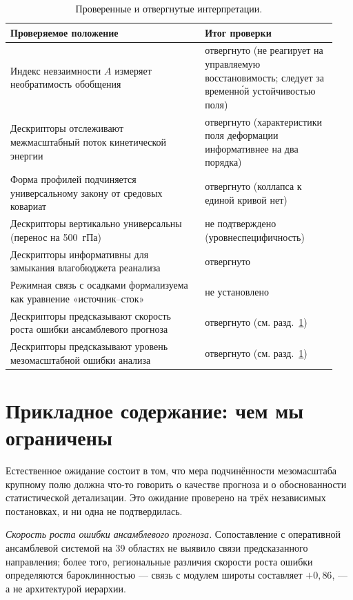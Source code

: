 \documentclass[11pt,a4paper]{article}
\begin{document}
\begin{table}[t]
\centering
\caption{Проверенные и отвергнутые интерпретации.}
\label{tab:negative}
\small
\begin{tabular}{@{}p{0.56\linewidth}p{0.38\linewidth}@{}}
\toprule
Проверяемое положение & Итог проверки\\
\midrule
Индекс невзаимности $A$ измеряет необратимость обобщения & отвергнуто (не реагирует на управляемую восстановимость; следует за временн\'{о}й устойчивостью поля)\\
Дескрипторы отслеживают межмасштабный поток кинетической энергии & отвергнуто (характеристики поля деформации информативнее на два порядка)\\
Форма профилей подчиняется универсальному закону от средовых ковариат & отвергнуто (коллапса к единой кривой нет)\\
Дескрипторы вертикально универсальны (перенос на 500~гПа) & не подтверждено (уровнеспецифичность)\\
Дескрипторы информативны для замыкания влагобюджета реанализа & отвергнуто\\
Режимная связь с осадками формализуема как уравнение «источник--сток» & не установлено\\
Дескрипторы предсказывают скорость роста ошибки ансамблевого прогноза & отвергнуто (см. разд.~\ref{sec:applied})\\
Дескрипторы предсказывают уровень мезомасштабной ошибки анализа & отвергнуто (см. разд.~\ref{sec:applied})\\
\bottomrule
\end{tabular}
\end{table}

\section{Прикладное содержание: чем мы ограничены}
\label{sec:applied}

Естественное ожидание состоит в том, что мера подчинённости мезомасштаба крупному полю должна что-то говорить о качестве прогноза и о обоснованности статистической детализации. Это ожидание проверено на трёх независимых постановках, и ни одна не подтвердилась.

\emph{Скорость роста ошибки ансамблевого прогноза.} Сопоставление с оперативной ансамблевой системой на 39 областях не выявило связи предсказанного направления; более того, региональные различия скорости роста ошибки определяются бароклинностью --- связь с модулем широты составляет $+0{,}86$, --- а не архитектурой иерархии.
\end{document}
